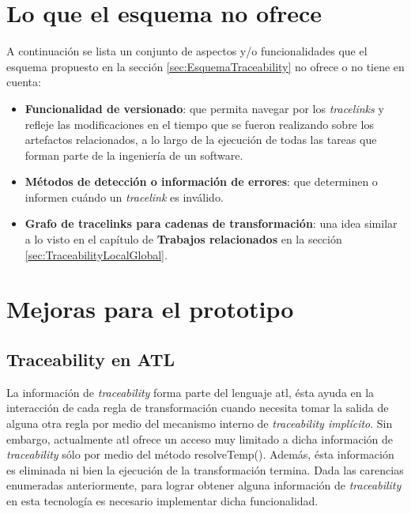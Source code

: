 \documentclass[a4paper,12pt,oneside,spanish]{book}
\begin{document}
\section*{Lo que el esquema no ofrece}
\label{sec:LoQueNoOfrece}

A continuación se lista un conjunto de aspectos y/o funcionalidades que el esquema propuesto en la sección \ref{sec:EsquemaTraceability} no ofrece o no tiene en cuenta:


\begin{itemize}

\item \textbf{Funcionalidad de versionado}: que permita navegar por los \textit{tracelinks} y refleje las modificaciones en el tiempo que se fueron realizando sobre los artefactos relacionados, a lo largo de la ejecución de todas las tareas que forman parte de la ingeniería de un software.

\item \textbf{Métodos de detección o información de errores}: que determinen o informen cuándo un \textit{tracelink} es inválido.

\item \textbf{Grafo de tracelinks para cadenas de transformación}: una idea similar a lo visto en el capítulo de \textbf{Trabajos relacionados} en la sección \ref{sec:TraceabilityLocalGlobal}.

\end{itemize}


\section*{Mejoras para el prototipo}


\subsection*{Traceability en ATL}
\label{cap:ATLTtraceability}

La información de \textit{traceability} forma parte del lenguaje \gls{atl}, ésta ayuda en la interacción de cada regla de transformación cuando necesita tomar la salida de alguna otra regla por medio del mecanismo interno de \textit{traceability implícito}. Sin embargo, actualmente \gls{atl} ofrece un acceso muy limitado a dicha información de \textit{traceability} sólo por medio del método \textsf{resolveTemp()}. Además, ésta información es eliminada ni bien la ejecución de la transformación termina. Dada las carencias enumeradas anteriormente, para lograr obtener alguna información de \textit{traceability} en esta tecnología es necesario implementar dicha funcionalidad.
\end{document}
